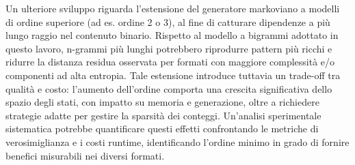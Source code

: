 \documentclass{report}
\begin{document}
Un ulteriore sviluppo riguarda l’estensione del generatore markoviano a modelli di ordine superiore
(ad es. ordine 2 o 3), al fine di catturare dipendenze a più lungo raggio nel contenuto binario.
Rispetto al modello a bigrammi adottato in questo lavoro, n-grammi più lunghi potrebbero riprodurre
pattern più ricchi e ridurre la distanza residua osservata per formati con maggiore complessità e/o
componenti ad alta entropia. Tale estensione introduce tuttavia un trade-off tra qualità e costo:
l’aumento dell’ordine comporta una crescita significativa dello spazio degli stati, con impatto su memoria
e generazione, oltre a richiedere strategie adatte per gestire la sparsità dei conteggi.
Un’analisi sperimentale sistematica potrebbe quantificare questi effetti confrontando le metriche di verosimiglianza
e i costi runtime, identificando l’ordine minimo in grado di
fornire benefici misurabili nei diversi formati.




\clearpage
 

\end{document}
